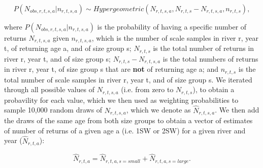 \documentclass[12pt]{article}
\begin{document}

\begin{equation}
P(N_{obs,r,t,s,a}|n_{r,t,s,a}) \sim Hypergeometric(N_{r,t,s,a}, N_{r,t,s} - N_{r,t,s,a}, n_{r,t,s}),
\end{equation}

where $P(N_{obs,r,t,s,a}|n_{r,t,s,a})$ is the probability of having a specific number of returns $N_{r,t,s,a}$ given 
$n_{r,t,s,a}$, which is the number of scale samples in river r, year t, of returning age a, and of size group s;
$N_{r,t,s}$ is the total number of returns in river r, year t, and of size group s;
$N_{r,t,s} - N_{r,t,s,a}$ is the total numbers of returns in river r, year t, of size group s that are \textbf{not} of returning age a;
and $n_{r,t,s}$ is the total number of scale samples in river r, year t, and of size group s.
We iterated through all possible values of $N_{r,t,s,a}$ (i.e. from zero to $N_{r,t,s}$), to obtain a probavility for each value, which
we then used as weighting probabilities to sample 10,000 random draws of $N_{r,t,s,a}$, which we denote as $\hat{N}_{r,t,s,a}$. 
We then add the draws of the same age from both size groups to obtain a vector of estimates of number of returns of a given age a (i.e. 1SW or 2SW) for a given river and year ($\hat{N}_{r,t,a}$):




\begin{equation}
    \hat{N}_{r,t,a} = \hat{N}_{r,t,a,s=small }+ \hat{N}_{r,t,a,s=large}.
\end{equation}
\end{document}
